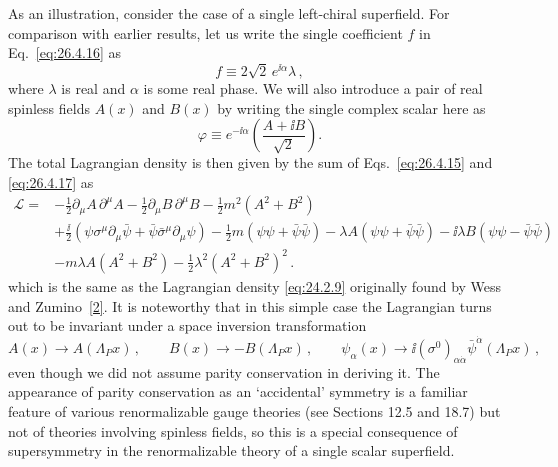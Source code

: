 As an illustration, consider the case of a single left-chiral superfield. For
comparison with earlier results, let us write the single coefficient \(f\) in
Eq.~\eqref{eq:26.4.16} as
\begin{equation}
  f\equiv2\sqrt2\,e^{\ii\alpha}\lambda\,,
  \tag{26.4.18}\label{eq:26.4.18}
\end{equation}
where \(\lambda\) is real and \(\alpha\) is some real phase. We will also
introduce a pair of real spinless fields \(A(x)\) and \(B(x)\) by writing the
single complex scalar here as
\begin{equation}
  \varphi\equiv e^{-\ii\alpha}\left(\frac{A+\ii B}{\sqrt2}\right).
  \tag{26.4.19}\label{eq:26.4.19}
\end{equation}
The total Lagrangian density is then given by the sum of
Eqs.~\eqref{eq:26.4.15} and \eqref{eq:26.4.17} as
\begin{equation}
  \begin{aligned}
  \mathcal{L}={}&
  -\frac12\partial_\mu A\,\partial^\mu A
  -\frac12\partial_\mu B\,\partial^\mu B
  -\frac12m^2(A^2+B^2)
  \\
  &+\frac{\ii}{2}\left(
    \psi\sigma^\mu\partial_\mu\bar\psi
    +\bar\psi\bar\sigma^\mu\partial_\mu\psi\right)
  -\frac12m(\psi\psi+\bar\psi\bar\psi)
  -\lambda A(\psi\psi+\bar\psi\bar\psi)
  -\ii\lambda B(\psi\psi-\bar\psi\bar\psi)
  \\
  &-m\lambda A(A^2+B^2)
  -\frac12\lambda^2(A^2+B^2)^2\,.
  \end{aligned}
  \tag{26.4.20}\label{eq:26.4.20}
\end{equation}
which is the same as the Lagrangian density \eqref{eq:24.2.9} originally found
by Wess and Zumino~\hyperref[ch26-ref-2]{[2]}. It is noteworthy that in this
simple case the Lagrangian turns out to be invariant under a space inversion
transformation
\begin{equation}
  A(x)\longrightarrow A(\Lambda_Px)\,,
  \qquad
  B(x)\longrightarrow-B(\Lambda_Px)\,,
  \qquad
  \psi_\alpha(x)\longrightarrow
  \ii(\sigma^0)_{\alpha\dot\alpha}
    \bar\psi^{\dot\alpha}(\Lambda_Px)\,,
  \tag{26.4.21}\label{eq:26.4.21}
\end{equation}
even though we did not assume parity conservation in deriving it. The
appearance of parity conservation as an `accidental' symmetry is a familiar
feature of various renormalizable gauge theories (see Sections 12.5 and 18.7)
but not of theories involving spinless fields, so this is a special
consequence of supersymmetry in the renormalizable theory of a single scalar
superfield.

